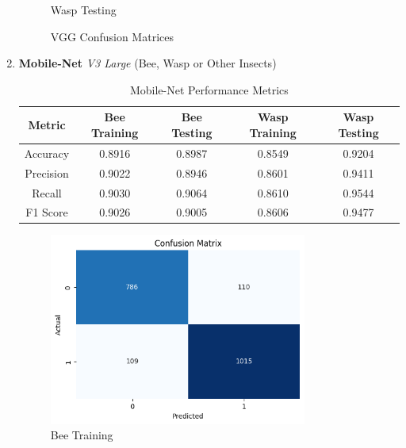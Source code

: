 \documentclass[12pt]{article}
\begin{document}
\begin{enumerate}
\begin{figure}[H]
\begin{minipage}{0.45\textwidth}
				Wasp Testing
			\end{minipage}
			\vspace{1 cm}
			\caption{VGG Confusion Matrices}
		\end{figure}
		\newpage
		\item \textbf{Mobile-Net} \textit{V3 Large}  (Bee, Wasp or Other Insects) \\
		\begin{table}[H]
			\centering
			\caption{Mobile-Net Performance Metrics}
			\vspace{0.25 cm}
			\begin{tabular}{|c|c|c|c|c|}
				\hline
				\textbf{Metric} & \textbf{Bee Training} & \textbf{Bee Testing}  & \textbf{Wasp Training} & \textbf{Wasp Testing}\\
				\hline
				Accuracy & 0.8916  & 0.8987 & 0.8549  & 0.9204\\ \hline
				Precision & 0.9022 & 0.8946 & 0.8601 & 0.9411\\ \hline
				Recall & 0.9030 & 0.9064 & 0.8610 & 0.9544 \\ \hline
				F1 Score & 0.9026  & 0.9005 & 0.8606  & 0.9477 \\ \hline
			\end{tabular}
			\label{tab:MOBILE_METRICS}
		\end{table}
		\begin{figure}[H]
			\vspace{0.5 cm}
			\centering
			\begin{minipage}{0.45\textwidth}
				\centering
				\includegraphics[width=0.8\textwidth]{Images/Confusion/mobile bees train.png} \\ \vspace{0.25 cm}
				Bee Training
			\end{minipage}
			\hfill

\end{figure}
\end{enumerate}
\end{document}

